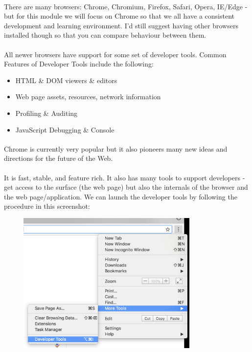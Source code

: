 \paragraph{} There are many browsers: Chrome, Chromium, Firefox, Safari, Opera, IE/Edge - but for this module we will focus on Chrome so that we all have a consistent development and learning environment. I'd still suggest having other browsers installed though so that you can compare behaviour between them.

\paragraph{} All newer browsers have support for some set of developer tools. Common Features of Developer Tools include the following:
\begin{itemize}
\item HTML \& DOM viewers \& editors
\item Web page assets, resources, network information 
\item Profiling \& Auditing
\item JavaScript Debugging \& Console 
\end{itemize}

\paragraph{} Chrome is currently very popular but it also pioneers many new ideas and directions for the future of the Web.
\paragraph{} It is fast, stable, and feature rich. It also has many tools to support developers - get access to the surface (the web page) but also the internals of the browser and the web page/application. We can launch the developer tools by following the procedure in this screenshot:

\begin{figure}[H]
\centering
\includegraphics[width=0.8\textwidth]{figures/devtools.png}
\label{fig:devtools}
\end{figure}


